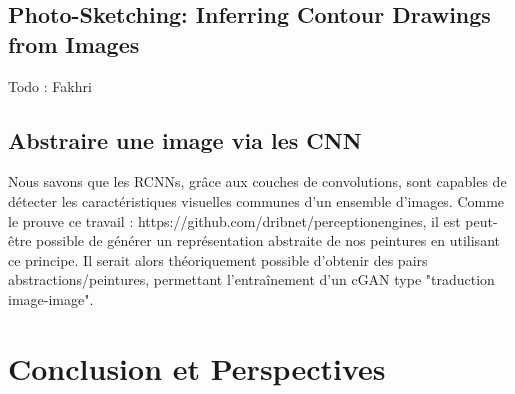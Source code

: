 \documentclass[a4paper, 12pt]{report}
\begin{document}
\section{Photo-Sketching: Inferring Contour Drawings from Images}
Todo : Fakhri

\section{Abstraire une image via les CNN}
Nous savons que les RCNNs, grâce aux couches de convolutions, sont capables de détecter les caractéristiques visuelles communes d'un ensemble d'images. Comme le prouve ce travail : https://github.com/dribnet/perceptionengines, il est peut-être possible de générer un représentation abstraite de nos peintures en utilisant ce principe. Il serait alors théoriquement possible d'obtenir des pairs abstractions/peintures, permettant l'entraînement d'un cGAN type "traduction image-image". 

\chapter{Conclusion et Perspectives\label{chap-conclusion}}



\end{document}
